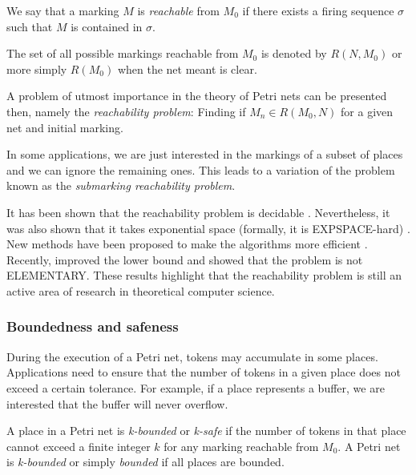 \begin{definition}[Reachability]

    We say that a marking $M$ is \textit{reachable} from $M_0$
    if there exists a firing sequence $\sigma$ such that $M$ is contained in $\sigma$.
\end{definition}

The set of all possible markings reachable from $M_0$ is denoted by $R(N, M_0)$ or more simply
$R(M_0)$ when the net meant is clear.

A problem of utmost importance in the theory of Petri nets can be presented then,
namely the \textit{reachability problem}:
Finding if $M_n \in R(M_0, N)$ for a given net and initial marking.

In some applications, we are just interested in the markings of a subset of places
and we can ignore the remaining ones.
This leads to a variation of the problem known as the \textit{submarking reachability problem}.

It has been shown that the reachability problem is decidable \cite{mayr1981}.
Nevertheless, it was also shown that it takes exponential space (formally, it is EXPSPACE-hard) \cite{lipton1976}.
New methods have been proposed to make the algorithms more efficient \cite{kungas2005petri}.
Recently, \cite{czerwinski2020reachability} improved the lower bound and showed that the problem is not ELEMENTARY.
These results highlight that the reachability problem is still an active area of research in theoretical computer science.

\subsubsection{Boundedness and safeness}

During the execution of a Petri net, tokens may accumulate in some places.
Applications need to ensure that the number of tokens in a given place does not
exceed a certain tolerance.
For example, if a place represents a buffer,
we are interested that the buffer will never overflow.

\begin{definition}[Boundedness]
    A place in a Petri net is \textit{k-bounded} or \textit{k-safe}
    if the number of tokens in that place cannot exceed a finite integer $k$
    for any marking reachable from $M_0$.
    A Petri net is \textit{k-bounded} or simply \textit{bounded} if all places are bounded.
\end{definition}

